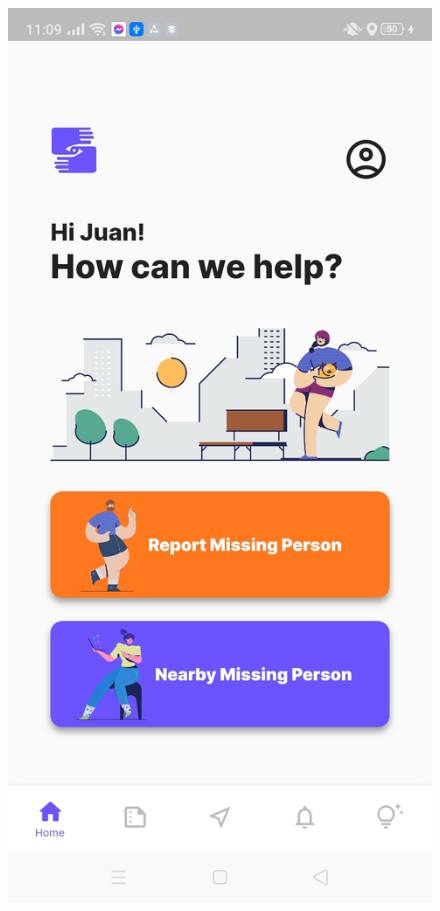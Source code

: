 \begin{figure}[!h]
    \centering
    \begin{minipage}[c]{0.40\linewidth}
        \centering
        \includegraphics[scale=0.15]{figures/Chapter4/Main/Home.jpg}

\end{minipage}
\end{figure}
